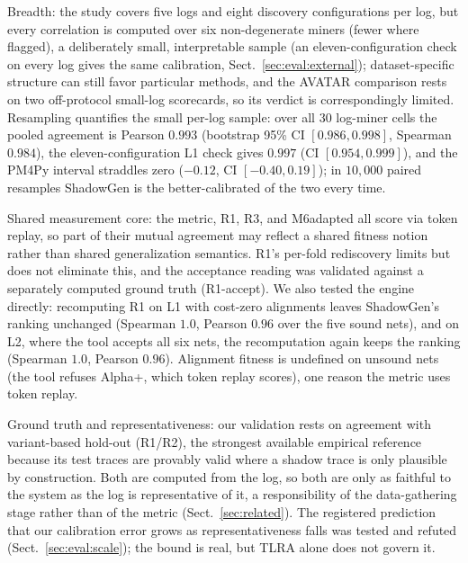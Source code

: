 \documentclass[runningheads]{llncs}
\newcommand{\chg}[1]{#1}
\begin{document}
\chg{Breadth: the study covers five logs and eight discovery configurations per log, but every correlation is computed over six non-degenerate miners (fewer where flagged), a deliberately small, interpretable sample (an eleven-configuration check on every log gives the same calibration, Sect.~\ref{sec:eval:external}); dataset-specific structure can still favor particular methods, and the AVATAR comparison rests on two off-protocol small-log scorecards, so its verdict is correspondingly limited.} \chg{Resampling quantifies the small per-log sample: over all $30$ log-miner cells the pooled agreement is Pearson $0.993$ (bootstrap 95\% CI $[0.986,0.998]$, Spearman $0.984$), the eleven-configuration L1 check gives $0.997$ (CI $[0.954,0.999]$), and the PM4Py interval straddles zero ($-0.12$, CI $[-0.40,0.19]$); in $10{,}000$ paired resamples ShadowGen is the better-calibrated of the two every time.}

Shared measurement core: the metric, R1, R3, and M6adapted all score via token replay, so part of their mutual agreement may reflect a shared fitness notion rather than shared generalization semantics. R1's per-fold rediscovery limits but does not eliminate this, and the acceptance reading was validated against a separately computed ground truth (R1-accept). \chg{We also tested the engine directly: recomputing R1 on L1 with cost-zero alignments leaves ShadowGen's ranking unchanged (Spearman $1.0$, Pearson $0.96$ over the five sound nets), and on L2, where the tool accepts all six nets, the recomputation again keeps the ranking (Spearman $1.0$, Pearson $0.96$). Alignment fitness is undefined on unsound nets (the tool refuses Alpha+, which token replay scores), one reason the metric uses token replay.}

Ground truth and representativeness: our validation rests on agreement with variant-based hold-out (R1/R2), the strongest available empirical reference because its test traces are provably valid where a shadow trace is only plausible by construction. Both are computed from the log, so both are only as faithful to the system as the log is representative of it, a responsibility of the data-gathering stage rather than of the metric (Sect.~\ref{sec:related}). \chg{The registered prediction that our calibration error grows as representativeness falls was tested and refuted (Sect.~\ref{sec:eval:scale}); the bound is real, but TLRA alone does not govern it.}
\end{document}
